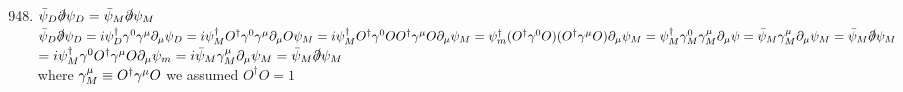 \documentclass[12pt]{amsart}
\begin{document}
\title{}
\maketitle

\setlength{\parindent}{0mm}


\begin{enumerate}
\setcounter{enumi}{947}

\item \underline{$\bar{\psi}_D \slashed{\partial} \psi_D = \bar{\psi}_M \slashed{\partial} \psi_M$}\\
$\bar{\psi}_D \slashed{\partial} \psi_D = i \psi_D^{\dagger} \gamma^0 \gamma^{\mu} \partial_{\mu} \psi_D = i \psi_M^{\dagger} O^{\dagger} \gamma^0  \gamma^{\mu}  \partial_{\mu} O \psi_M= i \psi_M^{\dagger} O^{\dagger} \gamma^0 O O^{\dagger} \gamma^{\mu} O \partial_{\mu} \psi_M\\
= \psi_m^{\dagger} ( O^{\dagger} \gamma^0 O)( O^{\dagger} \gamma^{\mu} O) \partial_{\mu} \psi_M\\
= \psi_M^{\dagger} \gamma_M^0 \gamma_M^{\mu} \partial_{\mu} \psi = \bar{\psi}_M \gamma_{M}^{\mu} \partial_{\mu} \psi_M = \bar{\psi}_M \slashed{\partial} \psi_M$\\
$= i \psi_M^{\dagger} \gamma^0 O^{\dagger} \gamma^{\mu} O \partial_{\mu} \psi_m = i \bar{\psi}_M \gamma_M^{\mu} \partial_{\mu} \psi_M = \bar{\psi}_M \slashed{\partial} \psi_M$\\
where $\gamma^{\mu}_M \equiv O^{\dagger} \gamma^{\mu} O\\$
we assumed $O^{\dagger} O=1$


\hdashrule[0.5ex][c]{\linewidth}{0.5pt}{1.5mm}



\end{enumerate}
\end{document}
